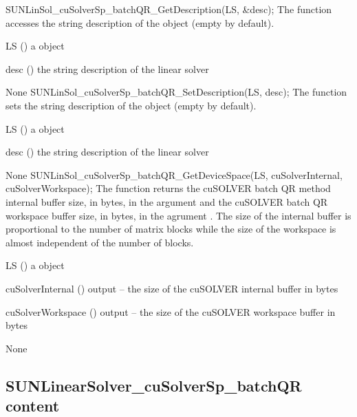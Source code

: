 %
%
{
  SUNLinSol\_cuSolverSp\_batchQR\_GetDescription(LS, \&desc);
}
{
  The function 
  accesses the string description of the object (empty by default).
}
{
  \begin{args}[options]
  \item[LS] ()
    a  object
  \item[desc] ()
    the string description of the linear solver
  \end{args}
}
{ None }
{}
{
  SUNLinSol\_cuSolverSp\_batchQR\_SetDescription(LS, desc);
}
{
  The function 
  sets the string description of the object (empty by default).
}
{
  \begin{args}[options]
  \item[LS] ()
    a  object
  \item[desc] ()
    the string description of the linear solver
  \end{args}
}
{ None }
{}
{
  SUNLinSol\_cuSolverSp\_batchQR\_GetDeviceSpace(LS, cuSolverInternal, cuSolverWorkspace);
}
{
  The function 
  returns the cuSOLVER batch QR method internal buffer size, in bytes,
  in the argument  and the cuSOLVER
  batch QR workspace buffer size, in bytes, in the agrument
  . The size of the internal buffer is
  proportional to the number of matrix blocks while the size
  of the workspace is almost independent of the number of blocks.
}
{
  \begin{args}[options]
  \item[LS] ()
    a  object
  \item[cuSolverInternal] ()
    output -- the size of the cuSOLVER internal buffer in bytes
  \item[cuSolverWorkspace] ()
    output -- the size of the cuSOLVER workspace buffer in bytes
  \end{args}
}
{ None }
{}

\subsection{SUNLinearSolver\_cuSolverSp\_batchQR content}\label{ss:sunlinsol_cuspbqr_content}

